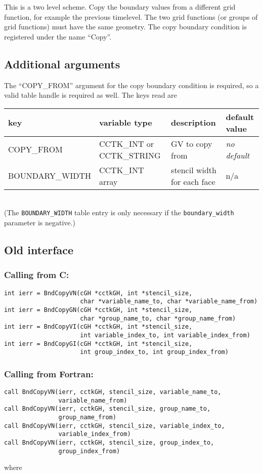 \documentclass{article}
\begin{document}
This is a two level scheme. Copy the boundary values from a different
grid function, for example the previous timelevel. The two grid
functions (or groups of grid functions) must have the same geometry.
The copy boundary condition is registered under the name ``Copy''.

\subsection{Additional arguments}

The ``COPY\_FROM'' argument for the copy boundary condition is
required, so a valid table handle is required as well.  The keys read are 
\\[1mm]
\begin{tabular}{|l|l|l|l|}
\hline
\textbf{key} & \textbf{variable type} & \textbf{description} & \textbf{default value}\\
\hline
COPY\_FROM & CCTK\_INT or CCTK\_STRING & GV to copy from & \emph{no default}\\
BOUNDARY\_WIDTH & CCTK\_INT array & stencil width for each face & n/a\\
\hline
\end{tabular}
\\[1mm]
(The \texttt{BOUNDARY\_WIDTH} table entry is only necessary if
the \texttt{boundary\_width} parameter is negative.)


\subsection{Old interface}

\subsubsection*{Calling from C:}
\begin{verbatim}
int ierr = BndCopyVN(cGH *cctkGH, int *stencil_size, 
                     char *variable_name_to, char *variable_name_from)
int ierr = BndCopyGN(cGH *cctkGH, int *stencil_size, 
                     char *group_name_to, char *group_name_from)
int ierr = BndCopyVI(cGH *cctkGH, int *stencil_size, 
                     int variable_index_to, int variable_index_from)
int ierr = BndCopyGI(cGH *cctkGH, int *stencil_size, 
                     int group_index_to, int group_index_from)
\end{verbatim}

\subsubsection*{Calling from Fortran:}
\begin{verbatim}
call BndCopyVN(ierr, cctkGH, stencil_size, variable_name_to,  
               variable_name_from)
call BndCopyVN(ierr, cctkGH, stencil_size, group_name_to,     
               group_name_from)
call BndCopyVN(ierr, cctkGH, stencil_size, variable_index_to, 
               variable_index_from)
call BndCopyVN(ierr, cctkGH, stencil_size, group_index_to,    
               group_index_from)
\end{verbatim}
where
\end{document}
